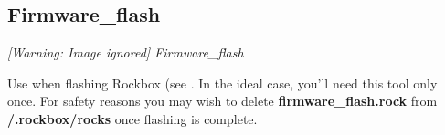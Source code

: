 \subsection{Firmware\_flash}
{\centering\mdseries\itshape
  [Warning: Image ignored] %
 \newline
Firmware\_flash
\par}

Use when flashing Rockbox (see .
In the ideal case, you'll need this tool only once. For safety reasons you may wish to delete \textbf{firmware\_flash.rock} from \textbf{/.rockbox/rocks} once flashing is complete.


